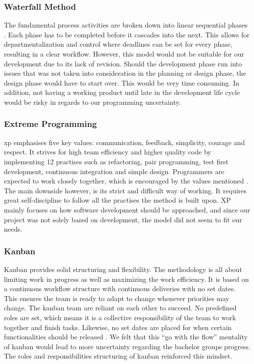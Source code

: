\subsubsection*{Waterfall Method}
The fundamental process activities are broken down into linear sequential phases \cite{WaterfallMethod}. Each phase has to be completed before it cascades into the next. This allows for departmentalization and control where deadlines can be set for every phase, resulting in a clear workflow. However, this model would not be suitable for our development due to its lack of revision. Should the development phase run into issues that was not taken into consideration in the planning or design phase, the design phase would have to start over. This would be very time consuming. In addition, not having a working product until late in the development life cycle would be risky in regards to our programming uncertainty.   

\subsubsection*{Extreme Programming}
\acrfull{xp} emphasises five key values: communication, feedback, simplicity, courage and respect. It strives for high team efficiency and higher quality code by implementing 12 practises such as refactoring, pair programming, test first development, continuous integration and simple design. Programmers are expected to work closely together, which is encouraged by the values mentioned \cite{eXtremeP}. The main downside however, is its strict and difficult way of working. It requires great self-discipline to follow all the practises the method is built upon. XP mainly focuses on how software development should be approached, and since our project was not solely based on development, the model did not seem to fit our needs.  
\newpage

\subsubsection*{Kanban}
Kanban provides solid structuring and flexibility. The methodology is all about limiting work in progress as well as maximizing the work efficiency. It is based on a continuous workflow structure with continuous deliveries with no set dates. This ensures the team is ready to adapt to change whenever priorities may change. The kanban team are reliant on each other to succeed. No predefined roles are set, which means it is a collective responsibility of the team to work together and finish tasks. Likewise, no set dates are placed for when certain functionalities should be released \cite{kanban}. We felt that this ``go with the flow'' mentality of kanban would lead to more uncertainty regarding the bachelor groups progress. The roles and responsibilities structuring of kanban reinforced this mindset.  

